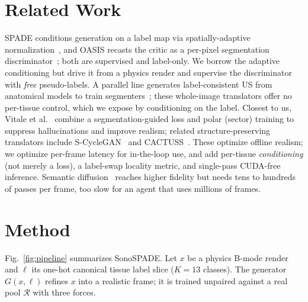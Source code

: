 \documentclass[runningheads]{llncs}
\begin{document}
\section{Related Work}
SPADE conditions generation on a label map
via spatially-adaptive normalization~\cite{park2019spade}, and OASIS recasts the critic as a per-pixel
segmentation discriminator~\cite{sushko2021oasis}; both are supervised and label-only. We borrow the
adaptive conditioning but drive it from a physics render and supervise the discriminator with \emph{free}
pseudo-labels. A parallel line generates label-consistent US from anatomical models to train
segmenters~\cite{gilbert2021synthetic}; these whole-image translators offer no per-tissue control, which
we expose by conditioning on the label.
Closest to us, Vitale et al.~\cite{vitale2025realism}
combine a segmentation-guided loss and polar (sector) training to suppress hallucinations and improve
realism; related structure-preserving translators include
S-CycleGAN~\cite{song2024scyclegan,zhu2017cyclegan} and CACTUSS~\cite{velikova2022cactuss}. These optimize
offline realism; we optimize per-frame latency for in-the-loop use, and add per-tissue \emph{conditioning}
(not merely a loss), a label-swap locality metric, and single-pass CUDA-free inference. Semantic
diffusion~\cite{stojanovski2023echofromnoise} reaches higher fidelity but needs tens to hundreds of passes
per frame, too slow for an agent that uses millions of frames.

\section{Method}
Fig.~\ref{fig:pipeline} summarizes SonoSPADE. Let $x$ be a physics B-mode render and $\ell$ its one-hot
canonical tissue label slice ($K{=}13$ classes). The generator $G(x,\ell)$ refines $x$ into a realistic
frame; it is trained unpaired against a real pool $\mathcal{R}$ with three forces.
\end{document}
